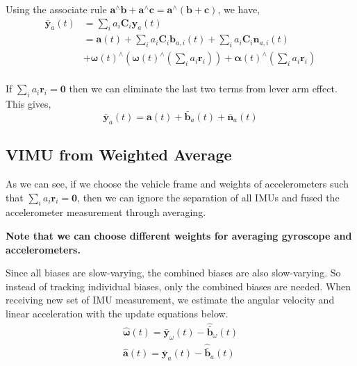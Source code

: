 \documentclass[conference]{IEEEtran}
\begin{document}
Using the associate rule $\textbf{a}^\wedge \textbf{b} + \textbf{a}^\wedge \textbf{c} = \textbf{a}^\wedge \left(\textbf{b} + \textbf{c}\right)$, we have,
\begin{equation}
\begin{split}
    \bar{\textbf{y}}_a(t) &= \sum_i{a_i \textbf{C}_{i} \textbf{y}_a(t)} \\
    &= \textbf{a}(t) + \sum_i{a_i \textbf{C}_{i} \textbf{b}_{a,i}(t)} + \sum_i{a_i \textbf{C}_{i} \textbf{n}_{a,i}(t)} \\
    &+ \bm{\omega}(t)^\wedge \left(\bm{\omega}(t)^\wedge \left( \sum_i{a_i \textbf{r}_i} \right) \right) + \bm{\alpha}(t)^\wedge \left( \sum_i{a_i\textbf{r}_i} \right)\\
\end{split}
\end{equation}

If $\sum_i{a_i \textbf{r}_i} = \textbf{0}$ then we can eliminate the last two terms from lever arm effect. This gives,
\begin{equation}
    \bar{\textbf{y}}_a(t) = \textbf{a}(t) + \bar{\textbf{b}}_a(t) + \bar{\textbf{n}}_a(t)
\end{equation}

\subsection{VIMU from Weighted Average}\label{AA}

As we can see, if we choose the vehicle frame and weights of accelerometers such that $\sum_i{a_i \textbf{r}_i} = \textbf{0}$, then we can ignore the separation of all IMUs and fused the accelerometer measurement through averaging.

\textbf{Note that we can choose different weights for averaging gyroscope and accelerometers.}

Since all biases are slow-varying, the combined biases are also slow-varying. So instead of tracking individual biases, only the combined biases are needed. When receiving new set of IMU measurement, we estimate the angular velocity and linear acceleration with the update equations below.
\begin{equation}
\begin{split}
    \hat{\bm{\omega}}(t) = \bar{\textbf{y}}_\omega(t) - \hat{\bar{\textbf{b}}}_\omega(t) \\
    \hat{\textbf{a}}(t)  = \bar{\textbf{y}}_a(t) - \hat{\bar{\textbf{b}}}_a(t)
\end{split}
\end{equation}
\end{document}
